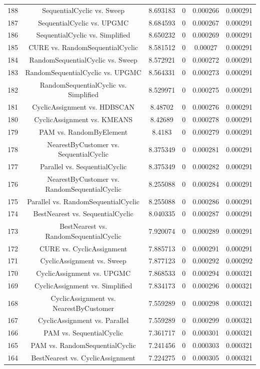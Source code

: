 \documentclass[a4paper,10pt]{article}
\begin{document}
\begin{landscape}
\begin{table}[!htp]
\begin{tabular}{cccccc}
188&SequentialCyclic vs. Sweep&8.693183&0&0.000266&0.000291\\
187&SequentialCyclic vs. UPGMC&8.684593&0&0.000267&0.000291\\
186&SequentialCyclic vs. Simplified&8.650232&0&0.000269&0.000291\\
185&CURE vs. RandomSequentialCyclic&8.581512&0&0.00027&0.000291\\
184&RandomSequentialCyclic vs. Sweep&8.572921&0&0.000272&0.000291\\
183&RandomSequentialCyclic vs. UPGMC&8.564331&0&0.000273&0.000291\\
182&RandomSequentialCyclic vs. Simplified&8.529971&0&0.000275&0.000291\\
181&CyclicAssignment vs. HDBSCAN&8.48702&0&0.000276&0.000291\\
180&CyclicAssignment vs. KMEANS&8.42689&0&0.000278&0.000291\\
179&PAM vs. RandomByElement&8.4183&0&0.000279&0.000291\\
178&NearestByCustomer vs. SequentialCyclic&8.375349&0&0.000281&0.000291\\
177&Parallel vs. SequentialCyclic&8.375349&0&0.000282&0.000291\\
176&NearestByCustomer vs. RandomSequentialCyclic&8.255088&0&0.000284&0.000291\\
175&Parallel vs. RandomSequentialCyclic&8.255088&0&0.000286&0.000291\\
174&BestNearest vs. SequentialCyclic&8.040335&0&0.000287&0.000291\\
173&BestNearest vs. RandomSequentialCyclic&7.920074&0&0.000289&0.000291\\
172&CURE vs. CyclicAssignment&7.885713&0&0.000291&0.000291\\
171&CyclicAssignment vs. Sweep&7.877123&0&0.000292&0.000292\\
170&CyclicAssignment vs. UPGMC&7.868533&0&0.000294&0.000321\\
169&CyclicAssignment vs. Simplified&7.834173&0&0.000296&0.000321\\
168&CyclicAssignment vs. NearestByCustomer&7.559289&0&0.000298&0.000321\\
167&CyclicAssignment vs. Parallel&7.559289&0&0.000299&0.000321\\
166&PAM vs. SequentialCyclic&7.361717&0&0.000301&0.000321\\
165&PAM vs. RandomSequentialCyclic&7.241456&0&0.000303&0.000321\\
164&BestNearest vs. CyclicAssignment&7.224275&0&0.000305&0.000321\\

\end{tabular}
\end{table}
\end{landscape}
\end{document}
